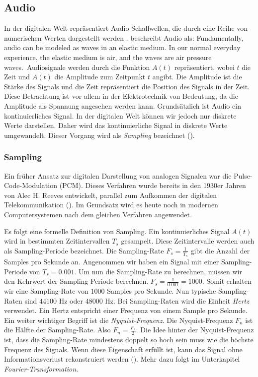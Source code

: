 \documentclass[11pt,a4paper]{article}
\begin{document}
\subsection{Audio}
In der digitalen Welt repräsentiert Audio Schallwellen, die durch eine Reihe von numerischen Werten 
dargestellt werden \cite[p.9]{somberg2019audioapi}. beschreibt Audio als: \glqq Fundamentally, 
audio can be modeled as waves in an elastic medium. In our normal everyday experience, the elastic 
medium is air, and the waves are air pressure waves.\grqq \ Audiosignale werden durch die Funktion
\(A(t)\) repräsentiert, wobei \(t\) die Zeit und \(A(t)\) die Amplitude zum
Zeitpunkt \(t\) angibt. Die Amplitude ist die Stärke des Signals und die Zeit repräsentiert die
Position des Signals in der Zeit. Diese Betrachtung ist vor allem in der Elektrotechnik
von Bedeutung, da die Amplitude als Spannung angesehen werden kann. Grundsätzlich ist Audio ein
kontinuierliches Signal. In der digitalen Welt können wir jedoch nur diskrete Werte darstellen.
Daher wird das kontinuierliche Signal in diskrete Werte umgewandelt. Dieser Vorgang wird als
\textit{Sampling} bezeichnet (\cite[Chapter~3.1]{tarr2018hackaudio}). 


\subsubsection{Sampling}
Ein früher Ansatz zur digitalen Darstellung von analogen Signalen war die Pulse-Code-Modulation
(PCM). Dieses Verfahren wurde bereits in den 1930er Jahren von Alec H. Reeves entwickelt,
parallel zum Aufkommen der digitalen Telekommunikation (\cite[p.~57]{deloraine1965pcm}).
Im Grundsatz wird es heute noch in modernen Computersystemen nach dem gleichen Verfahren angewendet.

\noindent
\newline
Es folgt eine formelle Definition von Sampling. Ein kontinuierliches Signal \(A(t)\)
wird in bestimmten Zeitintervallen \(T_s\) gesampelt. Diese Zeitintervalle werden auch als
Sampling-Periode bezeichnet. Die Sampling-Rate \(F_s = \displaystyle\frac{1}{T_s}\) gibt die Anzahl
der Samples pro Sekunde an. Angenommen wir haben ein Signal mit einer Sampling-Periode
von \(T_s = 0.001\). Um nun die Sampling-Rate zu berechnen, müssen wir den Kehrwert der
Sampling-Periode berechnen. \(F_s = \displaystyle\frac{1}{0.001} = 1000\). Somit erhalten wir eine
Sampling-Rate von \(1000\) Samples pro Sekunde. Nun typische Sampling-Raten sind \(44100\) Hz
oder \(48000\) Hz. Bei Sampling-Raten wird die Einheit \textit{Hertz} verwendet. Ein Hertz entspricht
einer Frequenz von einem Sample pro Sekunde. Ein weiter wichtiger Begriff ist die
\textit{Nyquist-Frequenz}. Die Nyquist-Frequenz \(F_n\) ist die Hälfte der Sampling-Rate.
Also \(F_n = \displaystyle\frac{F_s}{2}\). Die Idee hinter der Nyquist-Frequenz ist, dass die
Sampling-Rate mindestens doppelt so hoch sein muss wie die höchste Frequenz des Signals. Wenn diese
Eigenschaft erfüllt ist, kann das Signal ohne Informationsverlust rekonstruiert werden 
(\cite[Chapter~3.1]{tarr2018hackaudio}). Mehr dazu folgt im Unterkapitel 
\textit{Fourier-Transformation}.
\end{document}

